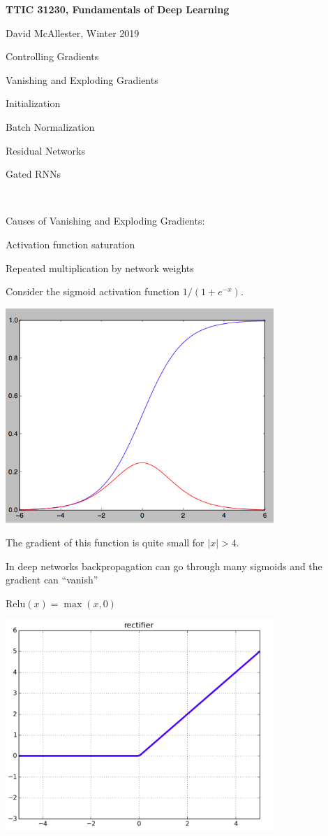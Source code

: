 




{\Huge

  \centerline{\bf TTIC 31230, Fundamentals of Deep Learning}
  \bigskip
  \centerline{David McAllester, Winter 2019}
  \vfill
  \centerline{Controlling Gradients}
  \vfill
  \vfill
  \centerline{Vanishing and Exploding Gradients}
  \vfill
  \centerline{Initialization}
  \vfill
  \centerline{Batch Normalization}
  \vfill
  \centerline{Residual Networks}
  \vfill
  \centerline{Gated RNNs}

~
\vfill
\centerline{Causes of Vanishing and Exploding Gradients:}
\vfill
\centerline{Activation function saturation}
\vfill
\centerline{Repeated multiplication by network weights}
\vfill


Consider the sigmoid activation function $1/(1+ e^{-x})$.

\vfill
\centerline{\includegraphics[width= 4.0in]{../images/sigmoid2}}


\vfill
The gradient of this function is quite small for $|x| > 4$.

\vfill
In deep networks backpropagation can go through many sigmoids and
the gradient can ``vanish''


$\mathrm{Relu}(x) = \max(x,0)$

\vfill
\centerline{\includegraphics[width= 4.0in]{../images/relu}}

}
